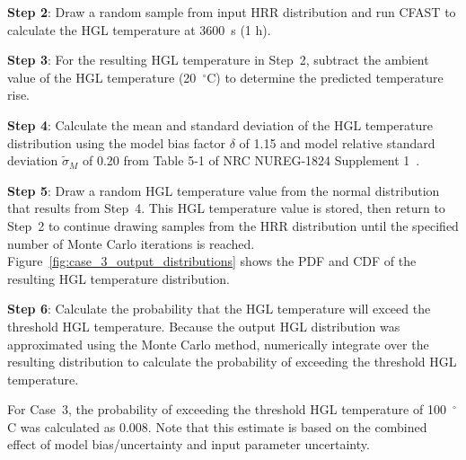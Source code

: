\documentclass[12pt]{article}
\begin{document}
\textbf{Step 2}: Draw a random sample from input HRR distribution and run CFAST to calculate the HGL temperature at 3600~s (1 h).

\textbf{Step 3}: For the resulting HGL temperature in Step~2, subtract the ambient value of the HGL temperature (20~$^\circ$C) to determine the predicted temperature rise.

\textbf{Step 4}: Calculate the mean and standard deviation of the HGL temperature distribution using the model bias factor $\delta$ of 1.15 and model relative standard deviation $\widetilde\sigma_M$ of 0.20 from Table 5-1 of NRC NUREG-1824 Supplement 1~\cite{NUREG_1824_Sup_1}.

\textbf{Step 5}: Draw a random HGL temperature value from the normal distribution that results from Step~4. This HGL temperature value is stored, then return to Step~2 to continue drawing samples from the HRR distribution until the specified number of Monte Carlo iterations is reached. Figure~\ref{fig:case_3_output_distributions} shows the PDF and CDF of the resulting HGL temperature distribution.

\textbf{Step 6}: Calculate the probability that the HGL temperature will exceed the threshold HGL temperature. Because the output HGL distribution was approximated using the Monte Carlo method, numerically integrate over the resulting distribution to calculate the probability of exceeding the threshold HGL temperature.

For Case~3, the probability of exceeding the threshold HGL temperature of 100~$^\circ$C was calculated as 0.008. Note that this estimate is based on the combined effect of model bias/uncertainty and input parameter uncertainty.


\clearpage
\end{document}
